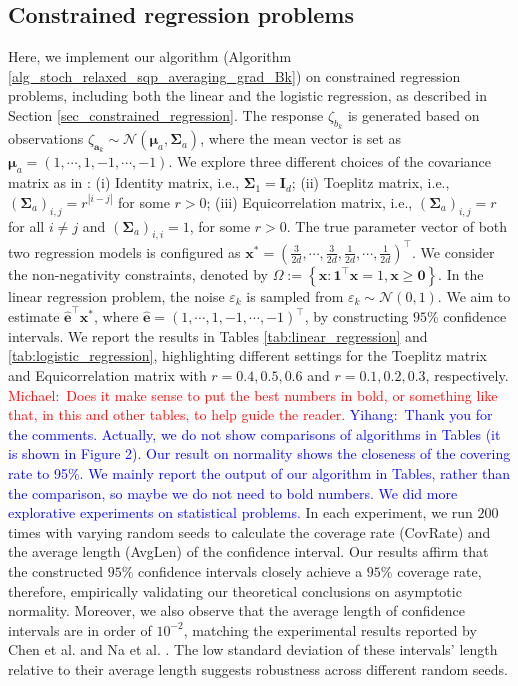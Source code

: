 \documentclass[aos]{imsart}
\numberwithin{equation}{section}
\theoremstyle{plain}
\newcommand{\michael}[1]{\textcolor{red}{Michael:\ #1}}
\newcommand{\yihang}[1]{\textcolor{blue}{Yihang:\ #1}}
\begin{document}
\subsection{Constrained regression problems}

Here, we implement our algorithm (Algorithm \ref{alg_stoch_relaxed_sqp_averaging_grad_Bk}) on constrained regression problems, including both the linear and the logistic regression, as described in Section \ref{sec_constrained_regression}. The response $\zeta_{b_k}$ is generated based on observations $\zeta_{\bm{a}_k} \sim \mathcal{N}\left(\bm{\mu}_{a}, \bm{\Sigma}_{a} \right)$, where the mean vector is set as $\bm{\mu}_a = (1, \cdots, 1, -1, \cdots, -1)$. We explore three different choices of the covariance matrix as in \cite{chen2020statistical}: (i) Identity matrix, i.e., $\bm{\Sigma}_1 = \bm{I}_d$; (ii) Toeplitz matrix, i.e., $(\bm{\Sigma}_{a})_{i,j} = r^{|i-j|}$ for some $r > 0$; (iii) Equicorrelation matrix, i.e., $(\bm{\Sigma}_{a})_{i,j} = r$ for all $i \neq j$ and $(\bm{\Sigma}_{a})_{i,i} = 1$, for some $r > 0$. The true parameter vector of both two regression models is configured as $\bm{x}^{*} = \left( \frac{3}{2d}, \cdots, \frac{3}{2d}, \frac{1}{2d}, \cdots, \frac{1}{2d}\right)^{\top}$. We consider the non-negativity constraints, denoted by $\Omega := \left\{\bm{x}: \bm{1}^{\top} \bm{x} = 1, \bm{x} \geq \bm{0}\right\}$. In the linear regression problem, the noise $\varepsilon_k$ is sampled from $\varepsilon_k \sim \mathcal{N}(0,1)$. We aim to estimate $\hat{\bm{e}}^{\top} \bm{x}^{*}$, where $\hat{\bm{e}} = \left(1,\cdots, 1, -1, \cdots, -1 \right)^{\top}$, by constructing $95\%$ confidence intervals. We report the results in Tables \ref{tab:linear_regression} and \ref{tab:logistic_regression}, highlighting different settings for the Toeplitz matrix and Equicorrelation matrix with $r = 0.4, 0.5, 0.6$ and $r=0.1, 0.2, 0.3$, respectively. 
\michael{Does it make sense to put the best numbers in bold, or something like that, in this and other tables, to help guide the reader.}
\yihang{Thank you for the comments. Actually, we do not show comparisons of algorithms in Tables (it is shown in Figure 2). Our result on normality shows the closeness of the covering rate to 95\%. We mainly report the output of our algorithm in Tables, rather than the comparison, so maybe we do not need to bold numbers. We did more explorative experiments on statistical problems.}
In each experiment, we run $200$ times with varying random seeds to calculate the coverage rate (CovRate) and the average length (AvgLen) of the confidence interval.
Our results affirm that the constructed $95\%$ confidence intervals closely achieve a $95\%$ coverage rate, therefore, empirically validating our theoretical conclusions on asymptotic normality.
Moreover, we also observe that the average length of confidence intervals are in order of $10^{-2}$, matching the experimental results reported by Chen et al. \cite{chen2020statistical} and Na et al. \cite{na2022asymptotic}. The low standard deviation of these intervals' length relative to their average length suggests robustness across different random seeds. 
\end{document}
